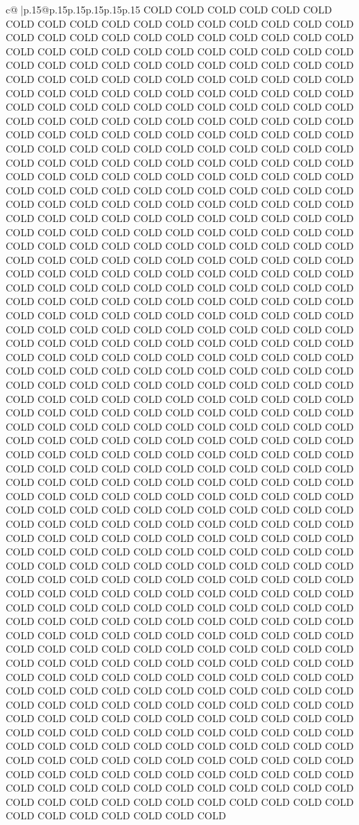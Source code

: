 \documentclass{article}
\begin{document}
{\begin{supertabular}{c@{$\;$}|p{.15\linewidth}@{}p{.15\linewidth}p{.15\linewidth}p{.15\linewidth}p{.15\linewidth}p{.15\linewidth}}
{{{COLD COLD COLD COLD COLD COLD COLD COLD COLD COLD COLD COLD COLD COLD COLD COLD COLD COLD COLD COLD COLD COLD COLD COLD COLD COLD COLD COLD COLD COLD COLD COLD COLD COLD COLD COLD COLD COLD COLD COLD COLD COLD COLD COLD COLD COLD COLD COLD COLD COLD COLD COLD COLD COLD COLD COLD COLD COLD COLD COLD COLD COLD COLD COLD COLD COLD COLD COLD COLD COLD COLD COLD COLD COLD COLD COLD COLD COLD COLD COLD COLD COLD COLD COLD COLD COLD COLD COLD COLD COLD COLD COLD COLD COLD COLD COLD COLD COLD COLD COLD COLD COLD COLD COLD COLD COLD COLD COLD COLD COLD COLD COLD COLD COLD COLD COLD COLD COLD COLD COLD COLD COLD COLD COLD COLD COLD COLD COLD COLD COLD COLD COLD COLD COLD COLD COLD COLD COLD COLD COLD COLD COLD COLD COLD COLD COLD COLD COLD COLD COLD COLD COLD COLD COLD COLD COLD COLD COLD COLD COLD COLD COLD COLD COLD COLD COLD COLD COLD COLD COLD COLD COLD COLD COLD COLD COLD COLD COLD COLD COLD COLD COLD COLD COLD COLD COLD COLD COLD COLD COLD COLD COLD COLD COLD COLD COLD COLD COLD COLD COLD COLD COLD COLD COLD COLD COLD COLD COLD COLD COLD COLD COLD COLD COLD COLD COLD COLD COLD COLD COLD COLD COLD COLD COLD COLD COLD COLD COLD COLD COLD COLD COLD COLD COLD COLD COLD COLD COLD COLD COLD COLD COLD COLD COLD COLD COLD COLD COLD COLD COLD COLD COLD COLD COLD COLD COLD COLD COLD COLD COLD COLD COLD COLD COLD COLD COLD COLD COLD COLD COLD COLD COLD COLD COLD COLD COLD COLD COLD COLD COLD COLD COLD COLD COLD COLD COLD COLD COLD COLD COLD COLD COLD COLD COLD COLD COLD COLD COLD COLD COLD COLD COLD COLD COLD COLD COLD COLD COLD COLD COLD COLD COLD COLD COLD COLD COLD COLD COLD COLD COLD COLD COLD COLD COLD COLD COLD COLD COLD COLD COLD COLD COLD COLD COLD COLD COLD COLD COLD COLD COLD COLD COLD COLD COLD COLD COLD COLD COLD COLD COLD COLD COLD COLD COLD COLD COLD COLD COLD COLD COLD COLD COLD COLD COLD COLD COLD COLD COLD COLD COLD COLD COLD COLD COLD COLD COLD COLD COLD COLD COLD COLD COLD COLD COLD COLD COLD COLD COLD COLD COLD COLD COLD COLD COLD COLD COLD COLD COLD COLD COLD COLD COLD COLD COLD COLD COLD COLD COLD COLD COLD COLD COLD COLD COLD COLD COLD COLD COLD COLD COLD COLD COLD COLD COLD COLD COLD COLD COLD COLD COLD COLD COLD COLD COLD COLD COLD COLD COLD COLD COLD COLD COLD COLD COLD COLD COLD COLD COLD COLD COLD COLD COLD COLD COLD COLD COLD COLD COLD COLD COLD COLD COLD COLD COLD COLD COLD COLD COLD COLD COLD COLD COLD COLD COLD COLD COLD COLD COLD COLD COLD COLD COLD COLD COLD COLD COLD COLD COLD COLD COLD COLD COLD COLD COLD COLD COLD COLD COLD COLD COLD COLD COLD COLD COLD COLD COLD COLD COLD COLD COLD COLD COLD COLD COLD COLD COLD COLD COLD COLD COLD COLD COLD COLD COLD COLD COLD COLD COLD COLD COLD COLD COLD COLD COLD COLD COLD COLD COLD COLD COLD COLD COLD COLD COLD COLD COLD COLD COLD COLD COLD COLD COLD COLD COLD COLD COLD COLD COLD COLD COLD COLD COLD COLD COLD COLD COLD COLD COLD COLD COLD COLD COLD COLD COLD COLD COLD COLD COLD COLD COLD COLD COLD COLD COLD COLD COLD COLD COLD COLD COLD COLD COLD COLD COLD COLD COLD COLD COLD COLD COLD COLD COLD COLD COLD COLD COLD COLD COLD COLD COLD COLD COLD COLD COLD COLD COLD COLD COLD COLD COLD COLD COLD COLD COLD COLD COLD COLD COLD COLD COLD COLD COLD COLD COLD COLD COLD COLD COLD COLD COLD }}}
\end{supertabular}}
\end{document}
